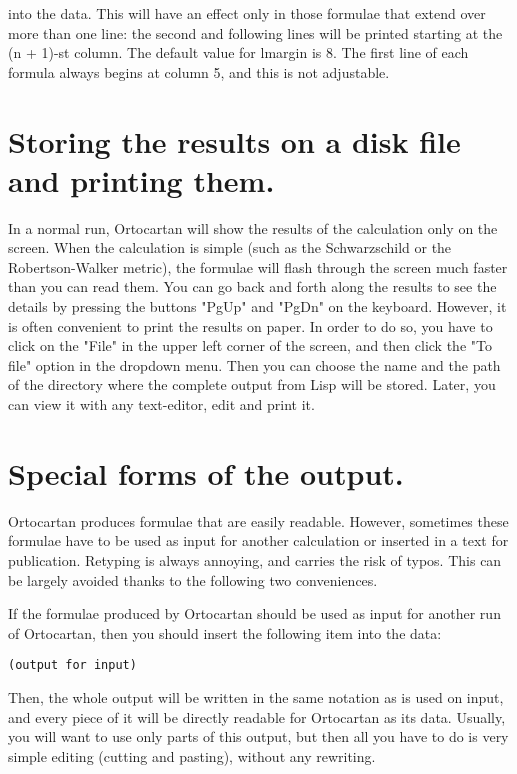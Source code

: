 \noindent into the data. This  will  have  an  effect  only  in  those
     formulae that extend over more than one line: the second and
     following lines will be printed starting at the (n + 1)-st
     column. The default value for lmargin is 8. The  first  line
     of each formula always begins at column 5, and this  is  not
     adjustable.

\section{Storing the results on a disk file and printing them.}

In a normal run, Ortocartan will show  the  results  of
     the calculation only  on  the  screen.  When  the
     calculation is simple (such  as  the  Schwarzschild  or  the
     Robertson-Walker  metric), the  formulae  will  flash
     through the screen much faster than you can read  them.  You
can go back and forth along the results to see the details by pressing the
buttons "PgUp" and "PgDn" on the keyboard. However, it is often convenient to
print the results on paper.  In  order  to  do  so,  you  have  to click on the
"File" in the upper left corner of the screen, and then click the "To file"
option in the dropdown menu. Then you can choose the name and the path of the
directory where the complete output from Lisp will be stored. Later, you can
view it with any text-editor, edit and print it.

\section{Special forms of the output.}

Ortocartan produces formulae that are easily readable. However, sometimes these
formulae have to be used as input for another calculation or inserted in a text
for publication. Retyping is always annoying, and carries the risk of typos.
This can be largely avoided thanks to the following two conveniences.

If the formulae produced by Ortocartan should be used as input for another run
of Ortocartan, then you should insert the following item into the data:

\bigskip

\begin{verbatim}
(output for input)
\end{verbatim}

\bigskip

\noindent Then, the whole output will be written in the same notation as is
used on input, and every piece of it will be directly readable for Ortocartan
as its data. Usually, you will want to use only parts of this output, but then
all you have to do is very simple editing (cutting and pasting), without any
rewriting.

